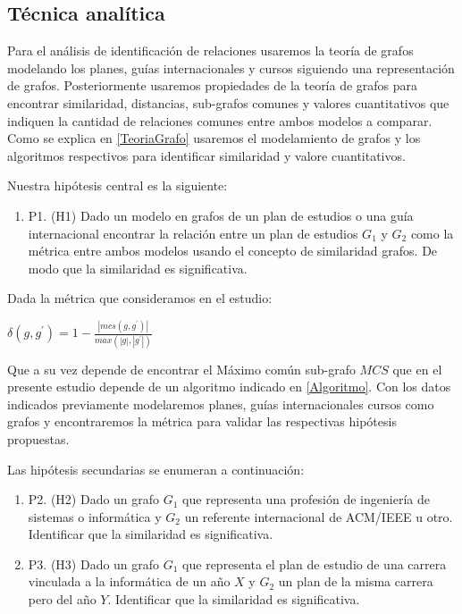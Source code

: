 \subsection{Técnica analítica}

Para el análisis de identificación de relaciones usaremos la teoría de grafos modelando los planes, guías internacionales y cursos siguiendo una representación de grafos. Posteriormente usaremos propiedades de la teoría de grafos para encontrar similaridad, distancias, sub-grafos comunes y valores cuantitativos que indiquen la cantidad de relaciones comunes entre ambos modelos a comparar. Como se explica en \ref{TeoriaGrafo} usaremos el modelamiento de grafos y los algoritmos respectivos para identificar similaridad y valore cuantitativos.

Nuestra hipótesis central es la siguiente:

\begin{enumerate}

	\item P1. (H1) Dado un modelo en grafos de un plan de estudios o una guía internacional encontrar la relación entre un plan de estudios $G_1$ y $G_2$ como la métrica entre ambos modelos usando el concepto de similaridad grafos. De modo que la similaridad es significativa. 

\end{enumerate}

Dada la métrica que consideramos en el estudio:

\begin{center}

 $\delta(g,g^\prime)=1-\frac{|mcs(g,g^\prime)|}{max(|g|,|g^\prime|)}$

\end{center}

Que a su vez depende de encontrar el Máximo común sub-grafo $MCS$ que en el presente estudio depende de un algoritmo indicado en \ref{Algoritmo}. Con los datos indicados previamente modelaremos planes, guías internacionales cursos como grafos y encontraremos la métrica para validar las respectivas hipótesis propuestas.

Las hipótesis secundarias se enumeran a continuación:

\begin{enumerate}


	\item P2. (H2)	Dado un grafo $G_1$ que representa una profesión de ingeniería de sistemas o informática y $G_2$ un referente internacional de ACM/IEEE u otro. Identificar que la similaridad es significativa. 

	\item P3. (H3) Dado un grafo $G_1$ que representa el plan de estudio de una carrera vinculada a la informática de un año $X$ y $G_2$ un plan de la misma carrera pero del año $Y$. Identificar que la similaridad es significativa.


\end{enumerate}

